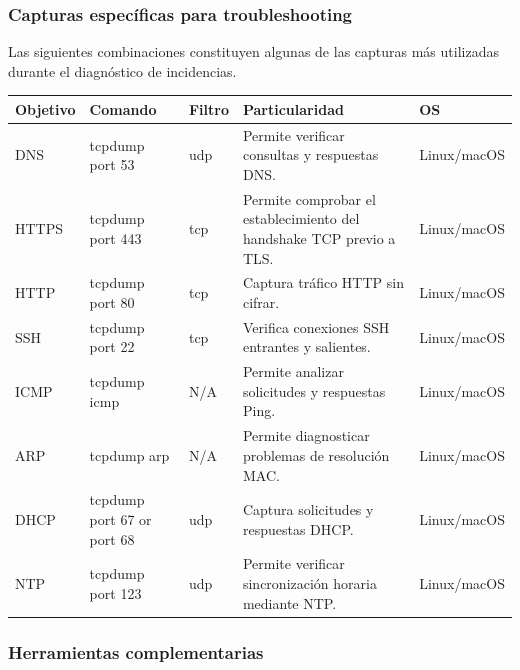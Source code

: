 \documentclass[a4paper,10pt]{article}
\begin{document}
\subsubsection{Capturas específicas para troubleshooting}

Las siguientes combinaciones constituyen algunas de las capturas más utilizadas
durante el diagnóstico de incidencias.

\begin{longtable}{|p{3cm}|p{4cm}|p{3cm}|p{5cm}|p{1.5cm}|}

\hline
Objetivo &
Comando &
Filtro &
Particularidad &
OS
\\
\hline
\endhead

DNS &
tcpdump port 53 &
udp &
Permite verificar consultas y respuestas DNS. &
Linux/macOS
\\
\hline

HTTPS &
tcpdump port 443 &
tcp &
Permite comprobar el establecimiento del handshake TCP previo a TLS. &
Linux/macOS
\\
\hline

HTTP &
tcpdump port 80 &
tcp &
Captura tráfico HTTP sin cifrar. &
Linux/macOS
\\
\hline

SSH &
tcpdump port 22 &
tcp &
Verifica conexiones SSH entrantes y salientes. &
Linux/macOS
\\
\hline

ICMP &
tcpdump icmp &
N/A &
Permite analizar solicitudes y respuestas Ping. &
Linux/macOS
\\
\hline

ARP &
tcpdump arp &
N/A &
Permite diagnosticar problemas de resolución MAC. &
Linux/macOS
\\
\hline

DHCP &
tcpdump port 67 or port 68 &
udp &
Captura solicitudes y respuestas DHCP. &
Linux/macOS
\\
\hline

NTP &
tcpdump port 123 &
udp &
Permite verificar sincronización horaria mediante NTP. &
Linux/macOS
\\
\hline

\end{longtable}


\subsubsection{Herramientas complementarias}
\end{document}
